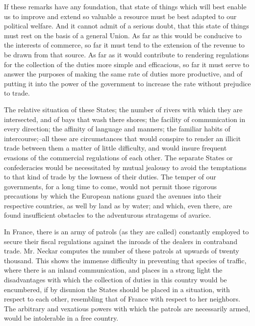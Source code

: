 If these remarks have any foundation, that state of things which will best enable us to improve and extend so valuable a resource must be best adapted to our political welfare. 
And it cannot admit of a serious doubt, that this state of things must rest on the basis of a general Union. 
As far as this would be conducive to the interests of commerce, so far it must tend to the extension of the revenue to be drawn from that source. 
As far as it would contribute to rendering regulations for the collection of the duties more simple and efficacious, so far it must serve to answer the purposes of making the same rate of duties more productive, and of putting it into the power of the government to increase the rate without prejudice to trade.

The relative situation of these States; the number of rivers with which they are intersected, and of bays that wash there shores; the facility of communication in every direction; the affinity of language and manners; the familiar habits of intercourse;--all these are circumstances that would conspire to render an illicit trade between them a matter of little difficulty, and would insure frequent evasions of the commercial regulations of each other. 
The separate States or confederacies would be necessitated by mutual jealousy to avoid the temptations to that kind of trade by the lowness of their duties. 
The temper of our governments, for a long time to come, would not permit those rigorous precautions by which the European nations guard the avenues into their respective countries, as well by land as by water; and which, even there, are found insufficient obstacles to the adventurous stratagems of avarice.

In France, there is an army of patrols (as they are called) constantly employed to secure their fiscal regulations against the inroads of the dealers in contraband trade. 
Mr. 
Neckar computes the number of these patrols at upwards of twenty thousand. 
This shows the immense difficulty in preventing that species of traffic, where there is an inland communication, and places in a strong light the disadvantages with which the collection of duties in this country would be encumbered, if by disunion the States should be placed in a situation, with respect to each other, resembling that of France with respect to her neighbors. 
The arbitrary and vexatious powers with which the patrols are necessarily armed, would be intolerable in a free country.

